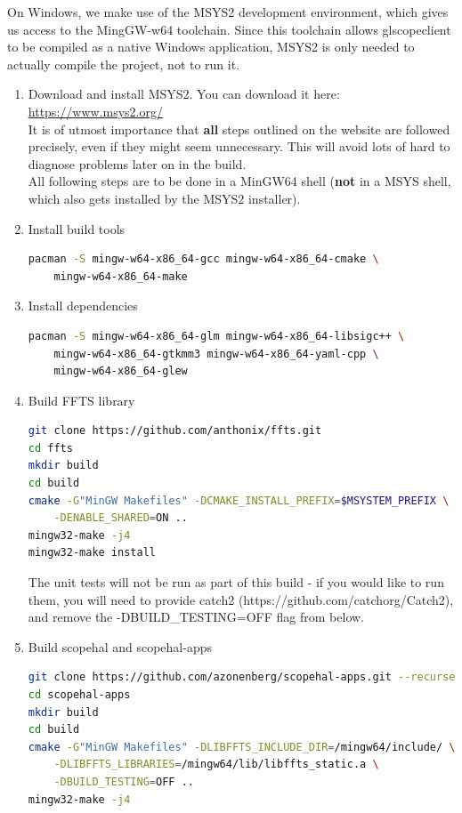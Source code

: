 On Windows, we make use of the MSYS2 development environment, which gives us access to the MingGW-w64 toolchain. Since this toolchain allows glscopeclient to be compiled as a native Windows application, MSYS2 is only needed to actually compile the project, not to run it.

\begin{enumerate}

\item Download and install MSYS2. You can download it here: \url{https://www.msys2.org/}\\
It is of utmost importance that \textbf{all} steps outlined on the website are followed precisely, even if they might seem unnecessary. This will avoid lots of hard to diagnose problems later on in the build.\\

All following steps are to be done in a MinGW64 shell (\textbf{not} in a MSYS shell, which also gets installed by the MSYS2 installer).

\item Install build tools
\begin{lstlisting}[language=sh]
pacman -S mingw-w64-x86_64-gcc mingw-w64-x86_64-cmake \
    mingw-w64-x86_64-make
\end{lstlisting}

\item Install dependencies
\begin{lstlisting}[language=sh]
pacman -S mingw-w64-x86_64-glm mingw-w64-x86_64-libsigc++ \
    mingw-w64-x86_64-gtkmm3 mingw-w64-x86_64-yaml-cpp \
    mingw-w64-x86_64-glew
\end{lstlisting}

\item Build FFTS library
\begin{lstlisting}[language=sh]
git clone https://github.com/anthonix/ffts.git
cd ffts
mkdir build
cd build
cmake -G"MinGW Makefiles" -DCMAKE_INSTALL_PREFIX=$MSYSTEM_PREFIX \
    -DENABLE_SHARED=ON ..
mingw32-make -j4
mingw32-make install
\end{lstlisting}

The unit tests will not be run as part of this build - if you would like to run them, you will need to provide catch2 (https://github.com/catchorg/Catch2), and remove the -DBUILD\_TESTING=OFF flag from below.

\item Build scopehal and scopehal-apps
\begin{lstlisting}[language=sh]
git clone https://github.com/azonenberg/scopehal-apps.git --recurse-submodules
cd scopehal-apps
mkdir build
cd build
cmake -G"MinGW Makefiles" -DLIBFFTS_INCLUDE_DIR=/mingw64/include/ \
    -DLIBFFTS_LIBRARIES=/mingw64/lib/libffts_static.a \
    -DBUILD_TESTING=OFF ..
mingw32-make -j4
\end{lstlisting}


\end{enumerate}

